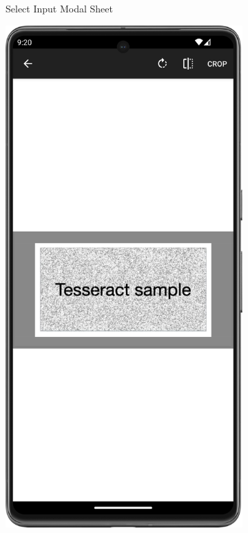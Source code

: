 \begin{figure}[H]
\begin{subfigure}[b]{0.3\textwidth}
    \caption{Select Input Modal Sheet}
    \label{fig:select_input}
  \end{subfigure}
  \hfill
  \begin{subfigure}[b]{0.3\textwidth}
    \includegraphics[width=\textwidth]{Figures/Product_Images/OCR/image_crop.png}

\end{subfigure}
\end{figure}
